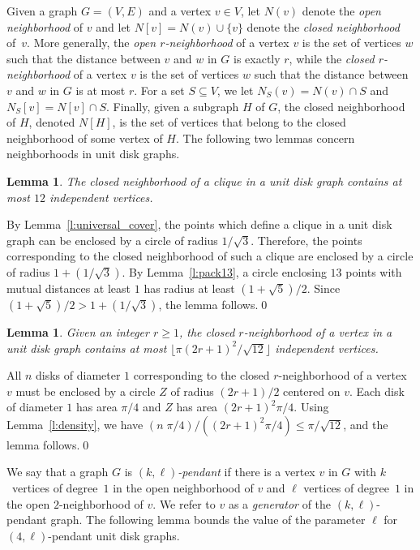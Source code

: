 \documentclass[preprint,12pt]{elsarticle}
\newtheorem{lem}[thm]{Lemma}
\begin{document}
Given a graph $G = (V,E)$ and a vertex $v \in V$, let $N(v)$ denote the \emph{open neighborhood} of $v$ and let $N[v] = N(v) \cup \{v\}$ denote the \emph{closed neighborhood} of~$v$. More generally, the \emph{open $r$-neighborhood} of a vertex $v$ is the set of vertices $w$ such that the distance between $v$ and $w$ in $G$ is exactly $r$, while the \emph{closed $r$-neighborhood} of a vertex $v$ is the set of vertices $w$ such that the distance between $v$ and $w$ in $G$ is at most $r$. For a set $S \subseteq V$, we let $N_{S}(v) = N(v) \cap S$ and $N_{S}[v] = N[v] \cap S$. Finally, given a subgraph $H$ of $G$, the closed neighborhood of $H$, denoted $N[H]$, is the set of vertices that belong to the closed neighborhood of some vertex of $H$. The following two lemmas concern neighborhoods in unit disk graphs.
\begin{lem} \label{l:clique}
The closed neighborhood of a clique in a unit disk graph contains at most $12$ independent vertices.
\end{lem}
\begin{pf}
By Lemma~\ref{l:universal_cover}, the points which define a clique in a unit disk graph can be enclosed by a circle of radius $1/\sqrt{3}$. Therefore, the points corresponding to the closed neighborhood of such a clique are enclosed by a circle of radius $1 + (1/\sqrt{3})$. By Lemma~\ref{l:pack13},
a circle enclosing $13$ points with mutual distances at least $1$ has radius at least $(1+\sqrt{5})/2$. Since $(1+\sqrt{5})/2 > 1 + (1/\sqrt{3})$, the lemma follows.\qed \end{pf}
\begin{lem} \label{l:2neighborhood}
Given an integer $r \geq 1$, the closed $r$-neighborhood of a vertex in a unit disk graph contains at most $\lfloor \pi (2r+1)^2 / \sqrt{12} \rfloor$ independent vertices.
\end{lem}
\begin{pf}
All $n$ disks of diameter $1$ corresponding to the closed $r$-neighborhood of a vertex $v$ must be enclosed by a circle $Z$ of radius $(2r+1)/2$ centered on $v$. Each disk of diameter $1$ has area $\pi/4$ and $Z$ has area $(2r+1)^2 \pi / 4$. Using Lemma~\ref{l:density}, we have $(n\; \pi / 4) / ((2r+1)^2 \pi / 4) \leq \pi/\sqrt{12}$, and the lemma follows.\qed
\end{pf}

We say that a graph $G$ is \emph{$(k,\ell)$-pendant} if there is a vertex $v$ in $G$ with $k$~vertices of degree~$1$ in the open neighborhood of $v$ and $\ell$ vertices of degree~$1$ in the open $2$-neighborhood of $v$. We refer to $v$ as a \emph{generator} of the $(k,\ell)$-pendant graph. The following lemma bounds the value of the parameter $\ell$ for $(4,\ell)$-pendant unit disk graphs.
\end{document}
